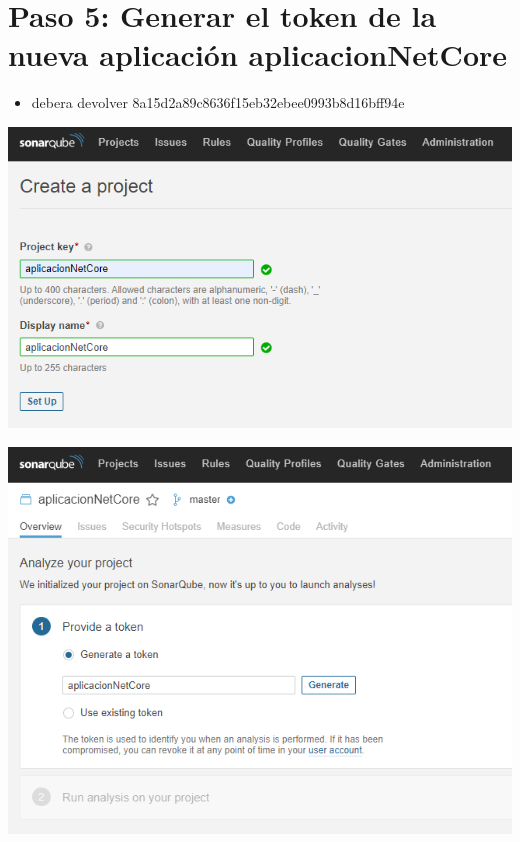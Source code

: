 \section{Paso 5: Generar el token de la nueva aplicación aplicacionNetCore}
\begin{itemize}
     \item  debera devolver 8a15d2a89c8636f15eb32ebee0993b8d16bff94e
\end{itemize}
\begin{center}
\includegraphics[width=\columnwidth]{images/6}\newline
\end{center}
\begin{center}
\includegraphics[width=\columnwidth]{images/7}\newline
\end{center}
